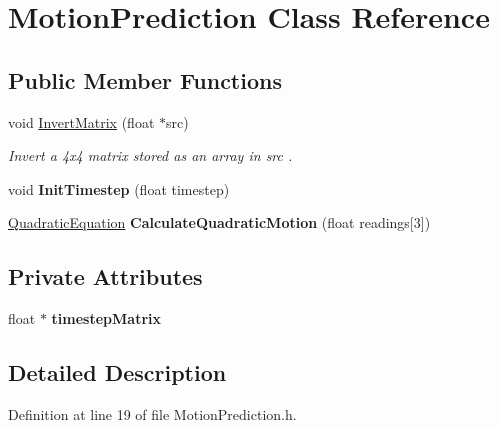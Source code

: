 \hypertarget{class_motion_prediction}{\section{Motion\-Prediction Class Reference}
\label{class_motion_prediction}
}
\subsection*{Public Member Functions}
\begin{DoxyCompactItemize}
\item 
void \hyperlink{class_motion_prediction_a97929e3649e633945486e3a83eb6e3fd}{Invert\-Matrix} (float $\ast$src)
\begin{DoxyCompactList}\small\item\em Invert a 4x4 matrix stored as an array in {\itshape src\/} . \end{DoxyCompactList}\item 
\hypertarget{class_motion_prediction_aaee1bbc4ba4e22b2d7810231d9bc977c}{void {\bfseries Init\-Timestep} (float timestep)}\label{class_motion_prediction_aaee1bbc4ba4e22b2d7810231d9bc977c}

\item 
\hypertarget{class_motion_prediction_a3fa6cd7f031d8ca6e8caabc9c02cf05e}{\hyperlink{struct_quadratic_equation}{Quadratic\-Equation} {\bfseries Calculate\-Quadratic\-Motion} (float readings\mbox{[}3\mbox{]})}\label{class_motion_prediction_a3fa6cd7f031d8ca6e8caabc9c02cf05e}

\end{DoxyCompactItemize}
\subsection*{Private Attributes}
\begin{DoxyCompactItemize}
\item 
\hypertarget{class_motion_prediction_af43b629d720ca1ce86caaa5a30768037}{float $\ast$ {\bfseries timestep\-Matrix}}\label{class_motion_prediction_af43b629d720ca1ce86caaa5a30768037}

\end{DoxyCompactItemize}


\subsection{Detailed Description}


Definition at line 19 of file Motion\-Prediction.\-h.




